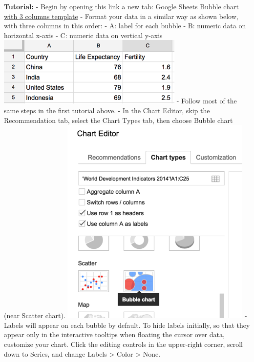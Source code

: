 \documentclass[
  english,
]{book}
\begin{document}
\textbf{Tutorial:}
- Begin by opening this link a new tab: \href{https://docs.google.com/spreadsheets/d/1CL7joH_3wvMYo9HIiSuFP0Ykv_Nl5DK6DYYcd3_gFnU/}{Google Sheets Bubble chart with 3 columns template}
- Format your data in a similar way as shown below, with three columns in this order:
- A: label for each bubble
- B: numeric data on horizontal x-axis
- C: numeric data on vertical y-axis
\includegraphics{images/05-chart/bubble-chart-3-column-data.png}
- Follow most of the same steps in the first tutorial above.
- In the Chart Editor, skip the Recommendation tab, select the Chart Types tab, then choose Bubble chart (near Scatter chart).
\includegraphics{images/05-chart/bubble-chart-types.png}
- Labels will appear on each bubble by default. To hide labels initially, so that they appear only in the interactive tooltips when floating the cursor over data, customize your chart. Click the editing controls in the upper-right corner, scroll down to Series, and change Labels \textgreater{} Color \textgreater{} None.
\end{document}
